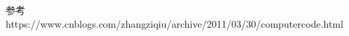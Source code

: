 
\begin{issues}
\issueDraft
\end{issues}

参考 https://www.cnblogs.com/zhangziqiu/archive/2011/03/30/computercode.html
